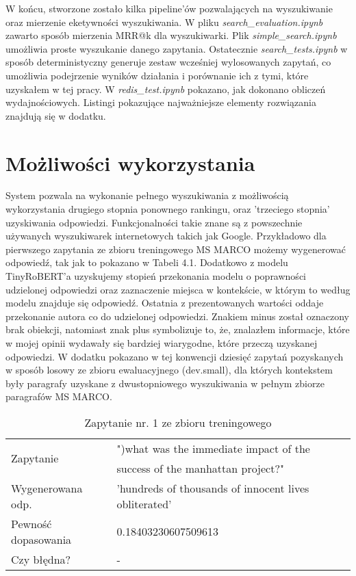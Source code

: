 W końcu, stworzone zostało kilka pipeline'ów pozwalających na wyszukiwanie oraz mierzenie eketywności wyszukiwania. W pliku \emph{search\_evaluation.ipynb} zawarto sposób mierzenia MRR@k dla wyszukiwarki. Plik \emph{simple\_search.ipynb} umożliwia proste wyszukanie danego zapytania. Ostatecznie \emph{search\_tests.ipynb} w sposób deterministyczny generuje zestaw wcześniej wylosowanych zapytań, co umożliwia podejrzenie wyników działania i porównanie ich z tymi, które uzyskałem w tej pracy. W \emph{redis\_test.ipynb} pokazano, jak dokonano obliczeń wydajnościowych. Listingi pokazujące najważniejsze elementy rozwiązania znajdują się w dodatku.

\section{Możliwości wykorzystania}

System pozwala na wykonanie pełnego wyszukiwania z możliwością wykorzystania drugiego stopnia ponownego rankingu, oraz 'trzeciego stopnia' uzyskiwania odpowiedzi. Funkcjonalności takie znane są z powszechnie używanych wyszukiwarek internetowych takich jak Google. Przykładowo dla pierwszego zapytania ze zbioru treningowego MS MARCO możemy wygenerować odpowiedź, tak jak to pokazano w Tabeli 4.1. Dodatkowo z modelu TinyRoBERT'a uzyskujemy stopień przekonania modelu o poprawności udzielonej odpowiedzi oraz zaznaczenie miejsca w kontekście, w którym to według modelu znajduje się odpowiedź. Ostatnia z prezentowanych wartości oddaje przekonanie autora co do udzielonej odpowiedzi. Znakiem minus został oznaczony brak obiekcji, natomiast znak plus symbolizuje to, że, znalazłem informacje, które w mojej opinii wydawały się bardziej wiarygodne, które przeczą uzyskanej odpowiedzi. W dodatku pokazano w tej konwencji dziesięć zapytań pozyskanych w sposób losowy ze zbioru ewaluacyjnego (dev.small), dla których kontekstem były paragrafy uzyskane z dwustopniowego wyszukiwania w pełnym zbiorze paragrafów MS MARCO. \newline

\begin{table}[htp]
\centering
\caption{Zapytanie nr. 1 ze zbioru treningowego\protect\footnotemark}
\vspace*{5mm}
\begin{tabular}{llll}
   \multirow{2}{3em}{Zapytanie} & ")what was the immediate impact of the \\
    & success of the manhattan project?"\\
   \hline
    Wygenerowana odp. & 'hundreds of thousands of innocent lives obliterated' \\
    \hline
    Pewność dopasowania &  0.18403230607509613\\
    \hline
    Czy błędna? & -\\
\end{tabular}
\end{table}

